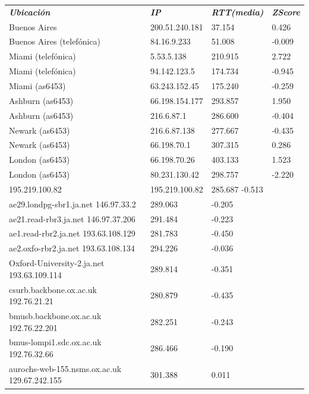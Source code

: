\begin{tabular}{llll}
	\textit{\textbf{Ubicaci\'on}}	&	\textit{\textbf{IP}}	&	\textit{\textbf{RTT(media)}}	&	\textit{\textbf{ZScore}}	\\
	Buenos Aires			&	200.51.240.181	&	37.154	&	0.426	\\
	Buenos Aires (telef\'onica)	&	84.16.9.233	&	51.008	&	-0.009	\\
	Miami (telef\'onica)		&	5.53.5.138	&	210.915	&	2.722	\\
	Miami (telef\'onica)		&	94.142.123.5	&	174.734	&	-0.945	\\
	Miami (as6453)			&	63.243.152.45	&	175.240	&	-0.259	\\
	Ashburn (as6453)		&	66.198.154.177	&	293.857	&	1.950	\\
	Ashburn (as6453)		&	216.6.87.1	&	286.600	&	-0.404	\\
	Newark (as6453)			&	216.6.87.138	&	277.667	&	-0.435	\\
	Newark (as6453)			&	66.198.70.1	&	307.315	&	0.286	\\
	London (as6453)			&	66.198.70.26	&	403.133	&	1.523	\\
	London (as6453)			&	80.231.130.42	&	298.757	&	-2.220	\\
	195.219.100.82			&	195.219.100.82	&	285.687	-0.513	\\
	ae29.londpg-sbr1.ja.net	146.97.33.2	&	289.063	&	-0.205	\\
	ae21.read-rbr3.ja.net	146.97.37.206	&	291.484	&	-0.223	\\
	ae1.read-rbr2.ja.net	193.63.108.129	&	281.783	&	-0.450	\\
	ae2.oxfo-rbr2.ja.net	193.63.108.134	&	294.226	&	-0.036	\\
	Oxford-University-2.ja.net	193.63.109.114	&	289.814	&	-0.351	\\
	csurb.backbone.ox.ac.uk	192.76.21.21	&	280.879	&	-0.435	\\
	bmusb.backbone.ox.ac.uk	192.76.22.201	&	282.251	&	-0.243	\\
	bmus-lompi1.sdc.ox.ac.uk	192.76.32.66	&	286.466	&	-0.190	\\
	aurochs-web-155.nsms.ox.ac.uk	129.67.242.155	&	301.388	&	0.011	\\

\end{tabular}

~

